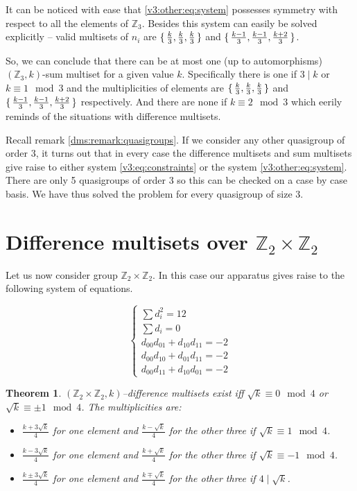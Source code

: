 \documentclass{article}
\theoremstyle{plain}
\newtheorem{theorem}{Theorem}[section]
\theoremstyle{definition}
\theoremstyle{remark}
\begin{document}
			It can be noticed with ease that \eqref{v3:other:eq:system} possesses symmetry with respect to all the elements of $\mathbb Z_3$. Besides this system can easily be solved explicitly -- valid multisets of $n_i$ are $\set{\frac k 3, \frac k 3, \frac k 3}$ and $\set{\frac{k-1}{3}, \frac{k-1}{3}, \frac{k+2}{3}}$.
			
			So, we can conclude that there can be at most one (up to automorphisms) $(\mathbb Z_3, k)$-sum multiset for a given value $k$. Specifically there is one if $3 \mid k$ or $k \equiv 1 \mod 3$ and the multiplicities of elements are $\set{\frac k 3, \frac k 3, \frac k 3}$ and $\set{\frac{k-1}{3}, \frac{k-1}{3}, \frac{k+2}{3}}$ respectively. And there are none if $k \equiv 2 \mod 3$ which eerily reminds of the situations with difference multisets.
			
			Recall remark \ref{dms:remark:quasigroups}. If we consider any other quasigroup of order 3, it turns out that in every case the difference multisets and sum multisets give raise to either system \eqref{v3:eq:constraints} or the system \eqref{v3:other:eq:system}. There are only 5 quasigroups of order 3 so this can be checked on a case by case basis. We have thus solved the problem for every quasigroup of size 3.
	
	\section{Difference multisets over $\mathbb Z_2 \times \mathbb Z_2$}
		Let us now consider group $\mathbb Z_2 \times \mathbb Z_2$. In this case our apparatus gives raise to the following system of equations.
		
		\begin{equation}
			\label{v4:eq:constraints}
			\begin{cases}
				\sum d_i^2 = 12 \\
				\sum d_i = 0 \\
				d_{00} d_{01} + d_{10} d_{11} = -2 \\
				d_{00} d_{10} + d_{01} d_{11} = -2 \\
				d_{00} d_{11} + d_{10} d_{01} = -2
			\end{cases}
		\end{equation}
		
		\begin{theorem}
			\label{v4:theorem:z2z2}
			$(\mathbb Z_2 \times \mathbb Z_2, k)$--difference multisets exist iff $\sqrt k \equiv 0 \mod 4$ or $\sqrt k \equiv \pm 1 \mod 4$. The multiplicities are:
			\begin{itemize}
				\item $\frac{k + 3 \sqrt k}{4}$ for one element and $\frac{k - \sqrt k}{4}$ for the other three if $\sqrt k \equiv 1 \mod 4$.
				\item $\frac{k - 3 \sqrt k}{4}$ for one element and $\frac{k + \sqrt k}{4}$ for the other three if $\sqrt k \equiv -1 \mod 4$.
				\item $\frac{k \pm 3 \sqrt k}{4}$ for one element and $\frac{k \mp \sqrt k}{4}$ for the other three if $4 \mid \sqrt k$.
			\end{itemize}
		\end{theorem}
		
\end{document}
